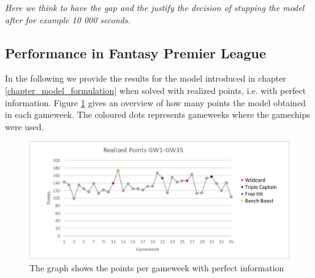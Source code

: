 \textit{Here we think to have the gap and the justify the decision of stupping the model after for example 10 000 seconds.}

\subsection{Performance in Fantasy Premier League}
In the following we provide the results for the model introduced in chapter \ref{chapter_model_formulation} when solved with realized points, i.e. with perfect information. Figure \ref{Figure_Realized_points} gives an overview of how many points the model obtained in each gameweek. The coloured dots represents gameweeks where the gamechips were used. 

\begin{figure}[H]
\label{fig:Realized_points}
    \centering
    \includegraphics[scale=0.75]{fig/chapter_7/RealizedPoints_colour.png}
    \caption{The graph shows the points per gameweek with perfect information}
\label{Figure_Realized_points}    
\end{figure}

